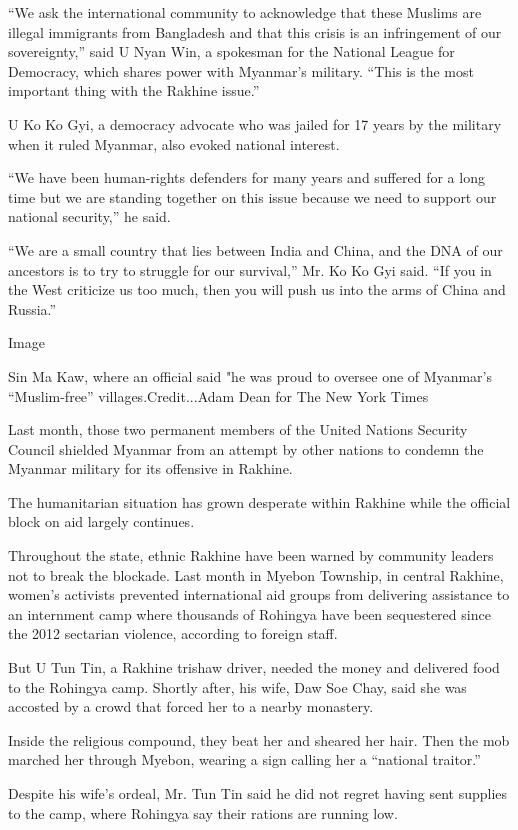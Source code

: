 ``We ask the international community to acknowledge that these Muslims
are illegal immigrants from Bangladesh and that this crisis is an
infringement of our sovereignty,'' said U Nyan Win, a spokesman for the
National League for Democracy, which shares power with Myanmar's
military. ``This is the most important thing with the Rakhine issue.''

U Ko Ko Gyi, a democracy advocate who was jailed for 17 years by the
military when it ruled Myanmar, also evoked national interest.

``We have been human-rights defenders for many years and suffered for a
long time but we are standing together on this issue because we need to
support our national security,'' he said.

``We are a small country that lies between India and China, and the DNA
of our ancestors is to try to struggle for our survival,'' Mr. Ko Ko Gyi
said. ``If you in the West criticize us too much, then you will push us
into the arms of China and Russia.''

Image

Sin Ma Kaw, where an official said "he was proud to oversee one of
Myanmar's ``Muslim-free'' villages.Credit...Adam Dean for The New York
Times

Last month, those two permanent members of the United Nations Security
Council shielded Myanmar from an attempt by other nations to condemn the
Myanmar military for its offensive in Rakhine.

The humanitarian situation has grown desperate within Rakhine while the
official block on aid largely continues.

Throughout the state, ethnic Rakhine have been warned by community
leaders not to break the blockade. Last month in Myebon Township, in
central Rakhine, women's activists prevented international aid groups
from delivering assistance to an internment camp where thousands of
Rohingya have been sequestered since the 2012 sectarian violence,
according to foreign staff.

But U Tun Tin, a Rakhine trishaw driver, needed the money and delivered
food to the Rohingya camp. Shortly after, his wife, Daw Soe Chay, said
she was accosted by a crowd that forced her to a nearby monastery.

Inside the religious compound, they beat her and sheared her hair. Then
the mob marched her through Myebon, wearing a sign calling her a
``national traitor.''

Despite his wife's ordeal, Mr. Tun Tin said he did not regret having
sent supplies to the camp, where Rohingya say their rations are running
low.

